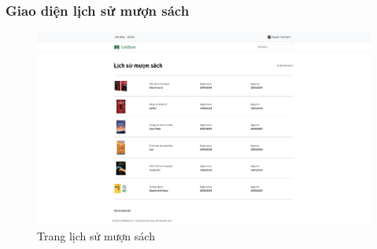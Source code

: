 \subsubsection{Giao diện lịch sử mượn sách}
\begin{figure}[H]
  \centering
  \includegraphics[width=1\textwidth]{report/images/client/c_lichsumuonsach.png}
  \caption{Trang lịch sử mượn sách}
\end{figure}